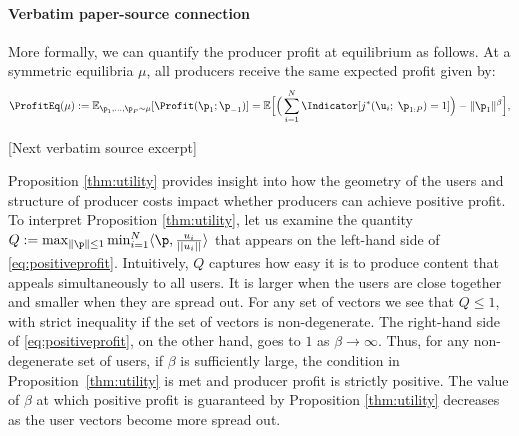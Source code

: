 \documentclass[10pt]{article}
\begin{document}
\paragraph{Verbatim paper-source connection}
\begin{ReviewVerbatim}
More formally, we can quantify the producer profit at equilibrium as follows. At a symmetric equilibria $\mu$, all producers receive the same expected profit given by:
\begin{equation}
   \ProfitEq(\mu) := \mathbb{E}_{\p_1, \ldots, \p_P \sim \mu} [\Profit(\p_1; \p_{-1})] =  \mathbb{E} \Big[ \Big(\sum_{i=1}^N \Indicator[j^*(\u_i;\;\p_{1:P}) = 1]\Big) - \|\p_1\|^{\beta}  \Big],
\end{equation}

[Next verbatim source excerpt]

Proposition \ref{thm:utility} provides insight into how the geometry of the users and structure of producer costs impact whether producers can achieve positive profit. To interpret Proposition \ref{thm:utility}, let us examine the quantity $Q := \max_{\|\p\| \le 1} \min_{i=1}^N  \langle \p, \frac{u_i}{||u_i||} \rangle$ that appears on the left-hand side of \eqref{eq:positiveprofit}. Intuitively, $Q$ captures how easy it is to produce content that appeals simultaneously to all users. It is larger when the users are close together and smaller when they are spread out. For any set of vectors we see that $Q \le 1$, with strict inequality if the set of vectors is non-degenerate. The right-hand side of \eqref{eq:positiveprofit}, on the other hand, goes to $1$ as $\beta \rightarrow \infty$. Thus, for any non-degenerate set of users, if $\beta$ is sufficiently large, the condition in Proposition~\ref{thm:utility} is met and producer profit is strictly positive. The value of $\beta$ at which positive profit is guaranteed by Proposition \ref{thm:utility} decreases as the user vectors become more spread out.
\end{ReviewVerbatim}
\end{document}
